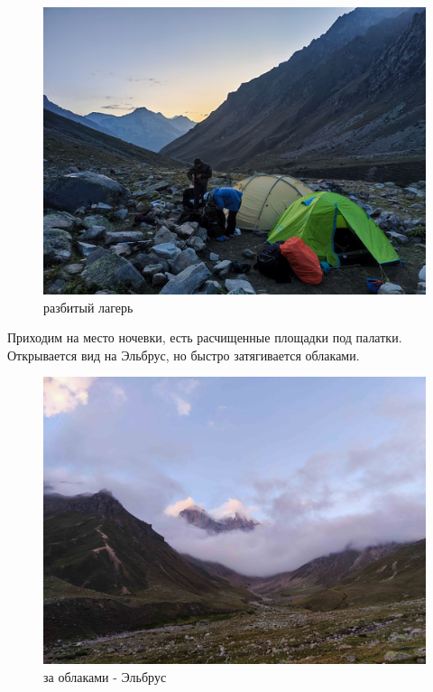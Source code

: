 \begin{figure}[h!]
	\centering
	\includegraphics[width=0.7\linewidth]{../pics/IMG_20240829_191225.jpg}
	\caption{разбитый лагерь}
	\label{fig:IMG_20240829_191225.jpg}
\end{figure}

Приходим на место ночевки, есть расчищенные площадки под палатки. Открывается вид на Эльбрус, но быстро затягивается облаками.

\begin{figure}[h!]
	\centering
	\includegraphics[width=0.7\linewidth]{../pics/IMG_20240829_184033}
	\caption{за облаками - Эльбрус}
	\label{fig:IMG_20240829_184033}
\end{figure}

\clearpage